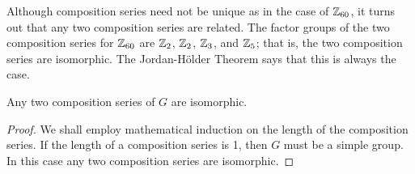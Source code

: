  
\vspace{2ex}
 
 
Although composition series need not be unique as in the case of
${\Bbb Z}_{60}$, it turns out that any two composition series are
related. The factor groups of the two composition series for ${\Bbb 
Z}_{60}$ are ${\Bbb Z}_2$,  ${\Bbb Z}_2$,  ${\Bbb Z}_3$, and  ${\Bbb
Z}_5$; that is,  the two composition series are isomorphic. The
Jordan-H\"{o}lder Theorem says that this is always the case.
 
 
\begin{theorem}
Any two composition series of $G$ are isomorphic.
\end{theorem}
 
 
\begin{proof}
We shall employ mathematical induction on the length of the
composition series.  If the length of a composition series is 1, 
then $G$ must be a simple group.  In this case any two composition
series are isomorphic.
 

\end{proof}
